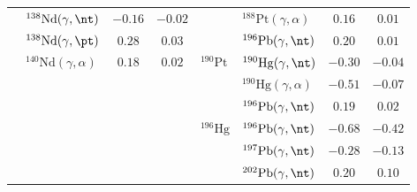 {\begin{longtable}{llcc llcc}
$ $ & $^{138}\mathrm{Nd}(\gamma,\nt)$ & $-0.16$ & $-0.02$ & $ $ & $^{188}\mathrm{Pt}(\gamma,\alpha)$ & $0.16$ & $0.01$ \\ 
$ $ & $^{138}\mathrm{Nd}(\gamma,\pt)$ & $0.28$ & $0.03$ & $ $ & $^{196}\mathrm{Pb}(\gamma,\nt)$ & $0.20$ & $0.01$ \\ 
$ $ & $^{140}\mathrm{Nd}(\gamma,\alpha)$ & $0.18$ & $0.02$ & $^{190}\mathrm{Pt}$ & $^{190}\mathrm{Hg}(\gamma,\nt)$ & $-0.30$ & $-0.04$ \\ 
$ $ & $ $ &  &  & $ $ & $^{190}\mathrm{Hg}(\gamma,\alpha)$ & $-0.51$ & $-0.07$ \\ 
$ $ & $ $ &  &  & $ $ & $^{196}\mathrm{Pb}(\gamma,\nt)$ & $0.19$ & $0.02$ \\ 
$ $ & $ $ &  &  & $^{196}\mathrm{Hg}$ & $^{196}\mathrm{Pb}(\gamma,\nt)$ & $-0.68$ & $-0.42$ \\ 
$ $ & $ $ &  &  & $ $ & $^{197}\mathrm{Pb}(\gamma,\nt)$ & $-0.28$ & $-0.13$ \\ 
$ $ & $ $ &  &  & $ $ & $^{202}\mathrm{Pb}(\gamma,\nt)$ & $0.20$ & $0.10$ \\ 
\end{longtable}
}

